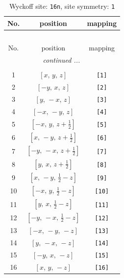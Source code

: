 \documentclass[fleqn,8pt]{jsarticle}
\begin{document}
\begin{longtable}{ccc}
\caption{Wyckoff site: {\tt 16n}, site symmetry: {\tt 1}}
 \\
 \hline \hline
No. & position & mapping \\ \hline \endfirsthead

\multicolumn{2}{l}{\tablename\ \thetable{}} \\
 \hline \hline
No. & position & mapping \\ \hline \endhead

 \hline \hline
\multicolumn{2}{r}{\footnotesize\it continued ...} \\ \endfoot

 \hline \hline
\multicolumn{2}{r}{} \\ \endlastfoot

1 & $\left[ x,\, y,\, z \right]$ & {\tt [1]} \\ \hline
2 & $\left[ - y,\, x,\, z \right]$ & {\tt [2]} \\ \hline
3 & $\left[ y,\, - x,\, z \right]$ & {\tt [3]} \\ \hline
4 & $\left[ - x,\, - y,\, z \right]$ & {\tt [4]} \\ \hline
5 & $\left[ - x,\, y,\, z + \frac{1}{2} \right]$ & {\tt [5]} \\ \hline
6 & $\left[ x,\, - y,\, z + \frac{1}{2} \right]$ & {\tt [6]} \\ \hline
7 & $\left[ - y,\, - x,\, z + \frac{1}{2} \right]$ & {\tt [7]} \\ \hline
8 & $\left[ y,\, x,\, z + \frac{1}{2} \right]$ & {\tt [8]} \\ \hline
9 & $\left[ x,\, - y,\, \frac{1}{2} - z \right]$ & {\tt [9]} \\ \hline
10 & $\left[ - x,\, y,\, \frac{1}{2} - z \right]$ & {\tt [10]} \\ \hline
11 & $\left[ y,\, x,\, \frac{1}{2} - z \right]$ & {\tt [11]} \\ \hline
12 & $\left[ - y,\, - x,\, \frac{1}{2} - z \right]$ & {\tt [12]} \\ \hline
13 & $\left[ - x,\, - y,\, - z \right]$ & {\tt [13]} \\ \hline
14 & $\left[ y,\, - x,\, - z \right]$ & {\tt [14]} \\ \hline
15 & $\left[ - y,\, x,\, - z \right]$ & {\tt [15]} \\ \hline
16 & $\left[ x,\, y,\, - z \right]$ & {\tt [16]} \\
\end{longtable}
\end{document}
